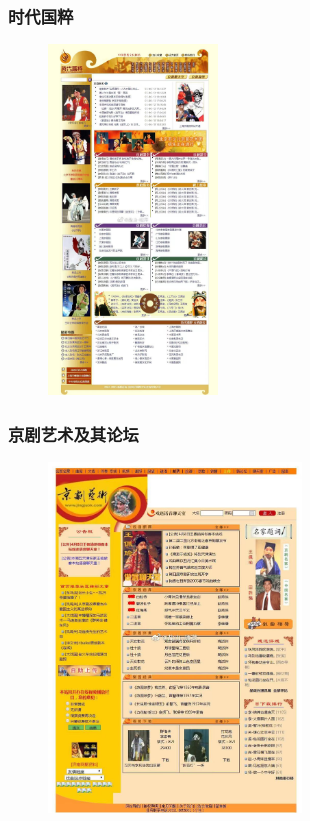 \documentclass[cjk,slidestop,compress,mathserif,blue]{beamer}
\begin{document}
\frame
{
	\frametitle{时代国粹}
\begin{figure}[h!]
\centering
\vspace{-0.2in}
\includegraphics[height=0.8\textwidth,width=0.4\textwidth,clip]{Figures/PekOpe_Shidai.jpg}
\label{Shidai}
\end{figure}
}

\frame
{
	\frametitle{京剧艺术及其论坛}
\begin{figure}[h!]
\centering
\vspace{-0.2in}
\includegraphics[height=0.8\textwidth,width=0.6\textwidth,clip]{Figures/PekOpe_Jingyi.jpg}
\label{Jingyi-1}
\end{figure}
}
\end{document}
